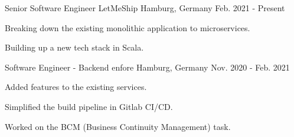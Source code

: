 

\begin{cventries}

  \cventry
    {Senior Software Engineer} %
    {LetMeShip} %
    {Hamburg, Germany} %
    {Feb. 2021 - Present} %
    {
      \begin{cvitems} %
        \item {Breaking down the existing monolithic application to microservices.}
        \item {Building up a new tech stack in Scala.}
      \end{cvitems}
    }

  \cventry
    {Software Engineer - Backend} %
    {enfore} %
    {Hamburg, Germany} %
    {Nov. 2020 - Feb. 2021} %
    {
      \begin{cvitems} %
        \item {Added features to the existing services.}
        \item {Simplified the build pipeline in Gitlab CI/CD.}
        \item {Worked on the BCM (Business Continuity Management) task.}
      \end{cvitems}
    }


\end{cventries}
